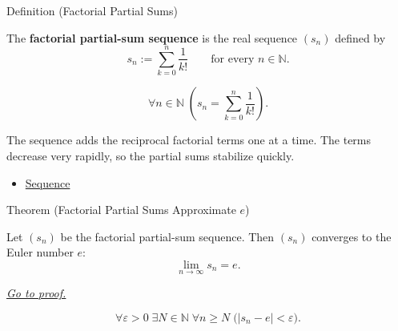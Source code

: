 \begin{definitionbox}{Definition (Factorial Partial Sums)}
\begin{definition}
\label{def:factorial-partial-sums}
The \textbf{factorial partial-sum sequence} is the real sequence $(s_n)$
defined by
\[
  s_n:=\sum_{k=0}^{n}\frac{1}{k!}
  \qquad\text{for every } n\in\mathbb{N}.
\]
\end{definition}
\end{definitionbox}

\begin{remark*}
\[
\forall n\in\mathbb{N}\;
\left(
  s_n=\sum_{k=0}^{n}\frac{1}{k!}
\right).
\]
\end{remark*}

\begin{remark*}[Interpretation]
The sequence adds the reciprocal factorial terms one at a time. The terms
decrease very rapidly, so the partial sums stabilize quickly.
\end{remark*}

\begin{remark*}[Dependencies]\hfill
\begin{itemize}
  \item \hyperref[def:sequence]{Sequence}
\end{itemize}
\end{remark*}


\begin{theorembox}{Theorem (Factorial Partial Sums Approximate $e$)}
\begin{theorem}
\label{thm:factorial-partial-sums-approximate-e}
Let $(s_n)$ be the factorial partial-sum sequence. Then $(s_n)$ converges
to the Euler number $e$:
\[
  \lim_{n\to\infty}s_n=e.
\]

\smallskip
\noindent
\hyperref[prf:factorial-partial-sums-approximate-e]{\textit{Go to proof.}}
\end{theorem}
\end{theorembox}

\begin{remark*}
\[
\forall \varepsilon>0\;\exists N\in\mathbb{N}\;\forall n\ge N
\;\bigl(|s_n-e|<\varepsilon\bigr).
\]
\end{remark*}

